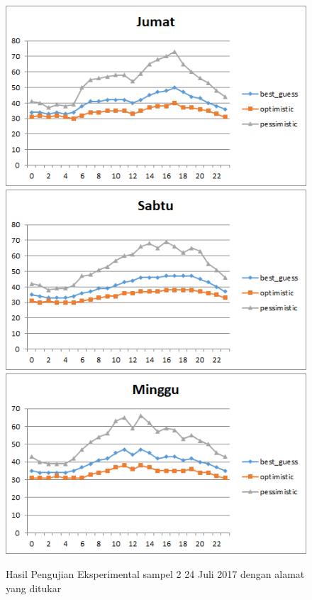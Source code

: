 \begin{figure}[H]
				\centering		
				\includegraphics[]{Gambar/jumatsampel224072017reverse.png}
				\includegraphics[]{Gambar/sabtusampel224072017reverse.png}
				\includegraphics[]{Gambar/minggusampel224072017reverse.png}
				\caption[Hasil Pengujian Eksperimental]{Hasil Pengujian Eksperimental sampel 2 24 Juli 2017 dengan alamat yang ditukar}
				\label{fig:eksperimentalsampel224072017reverse}
\end{figure}